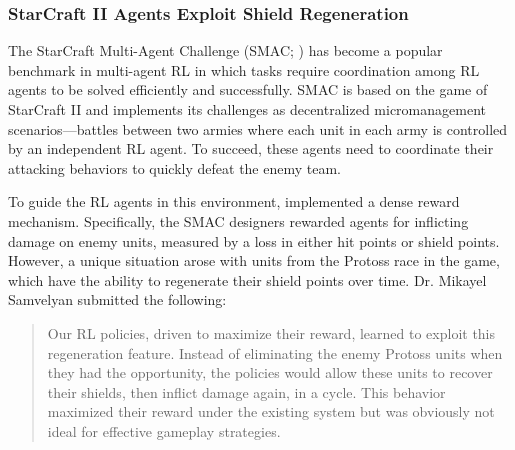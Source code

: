 \subsubsection{StarCraft II Agents Exploit Shield Regeneration~\citep{samvelyan2019starcraftmultiagentchallenge}}
\label{sec:smacshield}

The StarCraft Multi-Agent Challenge (SMAC; \citealp{samvelyan2019starcraftmultiagentchallenge}) has become a popular benchmark in multi-agent RL in which tasks require coordination among RL agents to be solved efficiently and successfully. SMAC is based on the game of StarCraft II and implements its challenges as decentralized micromanagement scenarios---battles between two armies where each unit in each army is controlled by an independent RL agent. To succeed, these agents need to coordinate their attacking behaviors to quickly defeat the enemy team.

To guide the RL agents in this environment, \citet{samvelyan2019starcraftmultiagentchallenge} implemented a dense reward mechanism. Specifically, the SMAC designers rewarded agents for inflicting damage on enemy units, measured by a loss in either hit points or shield points. However, a unique situation arose with units from the Protoss race in the game, which have the ability to regenerate their shield points over time. Dr. Mikayel Samvelyan submitted the following:

\begin{quote}

Our RL policies, driven to maximize their reward, learned to exploit this regeneration feature. Instead of eliminating the enemy Protoss units when they had the opportunity, the policies would allow these units to recover their shields, then inflict damage again, in a cycle. This behavior maximized their reward under the existing system but was obviously not ideal for effective gameplay strategies.

\end{quote}
